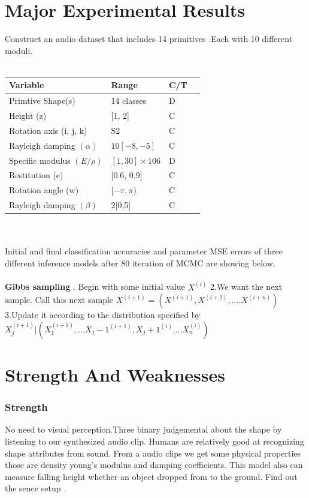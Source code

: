 \documentclass[12pt]{article}
\begin{document}
\section{Major Experimental Results}
Construct an audio dataset that includes 14 primitives .Each with 10 different moduli.\\
\\
\begin{tabular}{|l|l|l|l}
\hline
Variable & Range & C/T\\
\hline
Primtive Shape(s) & 14 classes & D \\
Height (z) & [1, 2] & C\\
Rotation axis (i, j, k) & S2 & C\\
Rayleigh damping $(\alpha)$ & $10[-8,-5]$ & C\\
Specific modulus $(E/\rho)$ & $[1, 30] \times 106$ & D\\
Restitution (e) & [0.6, 0.9] & C\\
Rotation angle (w) & $[-\pi, \pi)$ & C\\
Rayleigh damping $(\beta)$ & 2[0,5] & C\\
\hline
\end{tabular} 
\\
\\
Initial and final classification accuracies and parameter MSE errors of three different inference models after 80 iteration of MCMC are showing below. 
\\
\\
\textbf{Gibbs sampling} \newline  {}. Begin with some initial value  $ {X} ^{(i)} $ 
\newline \newline
2.We want the next sample. Call this next sample $ {X} ^{(i+1)} =  ( {X} ^{(i+1)} , {X} ^{(i+2)}, .... {X} ^{(i+n)}) $ \newline \newline
3.Update it according to the distribution specified by $ {X}_j
^{(i+1)} | ( {X}_1 ^{(i+1)} ,... {X}_j-1
^{(i+1)},{X}_j+1
^{(i)} .... {X}_n ^{(i)}) $ \newline \newline

\section{Strength And Weaknesses}
\subsubsection{Strength}
No need to visual perception.Three binary judgemental about the shape by listening to our synthesized audio clip. Humans are relatively good at recognizing shape attributes from sound. From a audio clips we get some physical properties those are density young's modulus and damping coefficients.
This model also can measure falling height whether an object dropped from to the ground. Find out the sence setup . 
\end{document}

